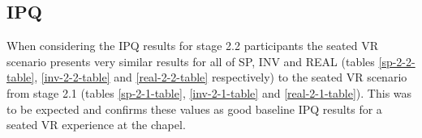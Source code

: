 
\newpage

\subsection{IPQ}

When considering the IPQ results for stage 2.2 participants the seated VR scenario presents very similar results for all of SP, INV and REAL (tables \ref{sp-2-2-table}, \ref{inv-2-2-table} and \ref{real-2-2-table} respectively) to the seated VR scenario from stage 2.1 (tables \ref{sp-2-1-table}, \ref{inv-2-1-table} and \ref{real-2-1-table}). This was to be expected and confirms these values as good baseline IPQ results for a seated VR experience at the chapel.


